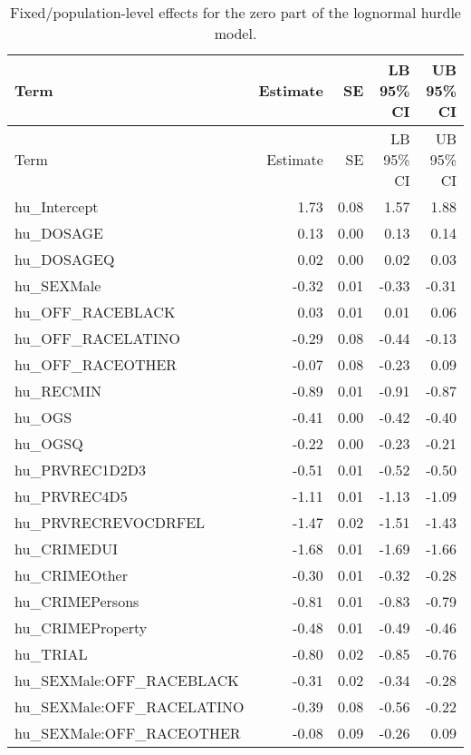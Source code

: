 \documentclass[
  letterpaper,
  DIV=11,
  numbers=noendperiod]{scrartcl}
\begin{document}
\hypertarget{tbl-brms-hurdle-model-summary-2-zero}{}
\begin{longtable}[]{@{}lrrrr@{}}
\caption{\label{tbl-brms-hurdle-model-summary-2-zero}Fixed/population-level
effects for the zero part of the lognormal hurdle model.}\tabularnewline
\toprule\noalign{}
Term & Estimate & SE & LB 95\% CI & UB 95\% CI \\
\midrule\noalign{}
\endfirsthead
\toprule\noalign{}
Term & Estimate & SE & LB 95\% CI & UB 95\% CI \\
\midrule\noalign{}
\endhead
\bottomrule\noalign{}
\endlastfoot
hu\_Intercept & 1.73 & 0.08 & 1.57 & 1.88 \\
hu\_DOSAGE & 0.13 & 0.00 & 0.13 & 0.14 \\
hu\_DOSAGEQ & 0.02 & 0.00 & 0.02 & 0.03 \\
hu\_SEXMale & -0.32 & 0.01 & -0.33 & -0.31 \\
hu\_OFF\_RACEBLACK & 0.03 & 0.01 & 0.01 & 0.06 \\
hu\_OFF\_RACELATINO & -0.29 & 0.08 & -0.44 & -0.13 \\
hu\_OFF\_RACEOTHER & -0.07 & 0.08 & -0.23 & 0.09 \\
hu\_RECMIN & -0.89 & 0.01 & -0.91 & -0.87 \\
hu\_OGS & -0.41 & 0.00 & -0.42 & -0.40 \\
hu\_OGSQ & -0.22 & 0.00 & -0.23 & -0.21 \\
hu\_PRVREC1D2D3 & -0.51 & 0.01 & -0.52 & -0.50 \\
hu\_PRVREC4D5 & -1.11 & 0.01 & -1.13 & -1.09 \\
hu\_PRVRECREVOCDRFEL & -1.47 & 0.02 & -1.51 & -1.43 \\
hu\_CRIMEDUI & -1.68 & 0.01 & -1.69 & -1.66 \\
hu\_CRIMEOther & -0.30 & 0.01 & -0.32 & -0.28 \\
hu\_CRIMEPersons & -0.81 & 0.01 & -0.83 & -0.79 \\
hu\_CRIMEProperty & -0.48 & 0.01 & -0.49 & -0.46 \\
hu\_TRIAL & -0.80 & 0.02 & -0.85 & -0.76 \\
hu\_SEXMale:OFF\_RACEBLACK & -0.31 & 0.02 & -0.34 & -0.28 \\
hu\_SEXMale:OFF\_RACELATINO & -0.39 & 0.08 & -0.56 & -0.22 \\
hu\_SEXMale:OFF\_RACEOTHER & -0.08 & 0.09 & -0.26 & 0.09 \\
\end{longtable}
\end{document}
